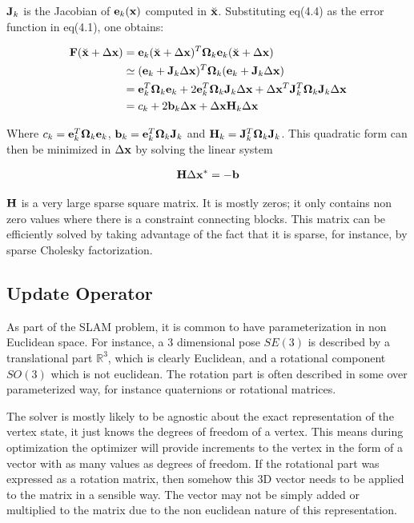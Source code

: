 $\mathbf J_k$ is the Jacobian of $\mathbf e_k(\mathbf x)$ computed in $\breve{\mathbf x}$.  Substituting eq(4.4) as the error function in eq(4.1), one obtains:

\begin{align}
  \mathbf F(\breve{\mathbf x} + \Delta \mathbf x) &= \mathbf e_k(\breve{\mathbf x} + \Delta \mathbf x)^T \mathbf \Omega_k \mathbf e_k(\breve{\mathbf x} + \Delta \mathbf x) \\
  & \simeq (\mathbf e_k + \mathbf J_k \Delta \mathbf x)^T 
    \mathbf \Omega_k 
    (\mathbf e_k + \mathbf J_k \Delta \mathbf x) \\
  &= \mathbf e_k^T \mathbf \Omega_k \mathbf e_k 
    + 2 \mathbf e_k^T \mathbf \Omega_k \mathbf J_k \Delta \mathbf x 
    + \Delta \mathbf x^T \mathbf J_k^T \mathbf \Omega_k \mathbf J_k \Delta \mathbf x \\
  &= c_k + 2\mathbf b_k \Delta \mathbf x + \Delta \mathbf x \mathbf H_k \Delta \mathbf x
\end{align}

Where $c_k = \mathbf e_k^T \mathbf \Omega_k \mathbf e_k$, $\mathbf b_k = \mathbf e_k^T \mathbf \Omega_k \mathbf J_k$ and $\mathbf H_k = \mathbf J_k^T \mathbf \Omega_k \mathbf J_k$. This quadratic form can then be minimized in $\Delta \mathbf x$ by solving the linear system

\begin{align}
   \mathbf H \Delta \mathbf x^* = -\mathbf b
\end{align}

$\mathbf H$ is a very large sparse square matrix.  It is mostly zeros; it only contains non zero values where there is a constraint connecting blocks.  This matrix can be efficiently solved by taking advantage of the fact that it is sparse, for instance, by sparse Cholesky factorization.

\subsection{Update Operator}
\label{sec:oplus}

As part of the SLAM problem, it is common to have parameterization in non Euclidean space.  For instance, a 3 dimensional pose $SE(3)$ is described by a translational part $\mathbb{R}^3$, which is clearly Euclidean, and a rotational component $SO(3)$ which is not euclidean.  The rotation part is often described in some over parameterized way, for instance quaternions or rotational matrices.  

The solver is mostly likely to be agnostic about the exact representation of the vertex state, it just knows the degrees of freedom of a vertex.  This means during optimization the optimizer will provide increments to the vertex in the form of a vector with as many values as degrees of freedom.  If the rotational part was expressed as a rotation matrix, then somehow this 3D vector needs to be applied to the matrix in a sensible way.  The vector may not be simply added or multiplied to the matrix due to the non euclidean nature of this representation.

